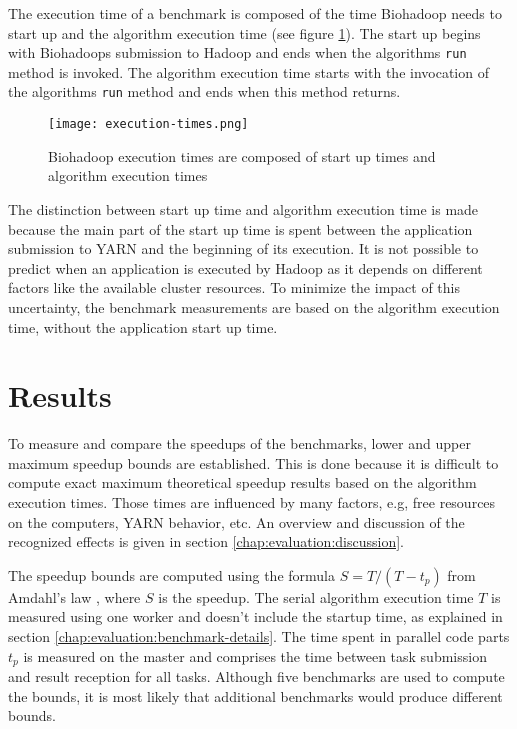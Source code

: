 The execution time of a benchmark is composed of the time Biohadoop needs to start up and the algorithm execution time (see figure \ref{fig:execution-times}). The start up begins with Biohadoops submission to Hadoop and ends when the algorithms \texttt{run} method is invoked. The algorithm execution time starts with the invocation of the algorithms \texttt{run} method and ends when this method returns.

\begin{figure}
  \centering
  \texttt{[image: execution-times.png]}
  \caption[Division of Biohadoop execution times]{Biohadoop execution times are composed of start up times and algorithm execution times}
  \label{fig:execution-times}
\end{figure}

The distinction between start up time and algorithm execution time is made because the main part of the start up time is spent between the application submission to YARN and the beginning of its execution. It is not possible to predict when an application is executed by Hadoop as it depends on different factors like the available cluster resources. To minimize the impact of this uncertainty, the benchmark measurements are based on the algorithm execution time, without the application start up time.


\section{Results}
\label{chap:evaluation:result}
To measure and compare the speedups of the benchmarks, lower and upper maximum speedup bounds are established. This is done because it is difficult to compute exact maximum theoretical speedup results based on the algorithm execution times. Those times are influenced by many factors, e.g, free resources on the computers, YARN behavior, etc. An overview and discussion of the recognized effects is given in section \ref{chap:evaluation:discussion}.

The speedup bounds are computed using the formula $S = T / (T - t_p)$ from Amdahl's law \cite{amdahl1967validity}, where $S$ is the speedup. The serial algorithm execution time $T$ is measured using one worker and doesn't include the startup time, as explained in section \ref{chap:evaluation:benchmark-details}. The time spent in parallel code parts $t_p$ is measured on the master and comprises the time between task submission and result reception for all tasks. Although five benchmarks are used to compute the bounds, it is most likely that additional benchmarks would produce different bounds.

